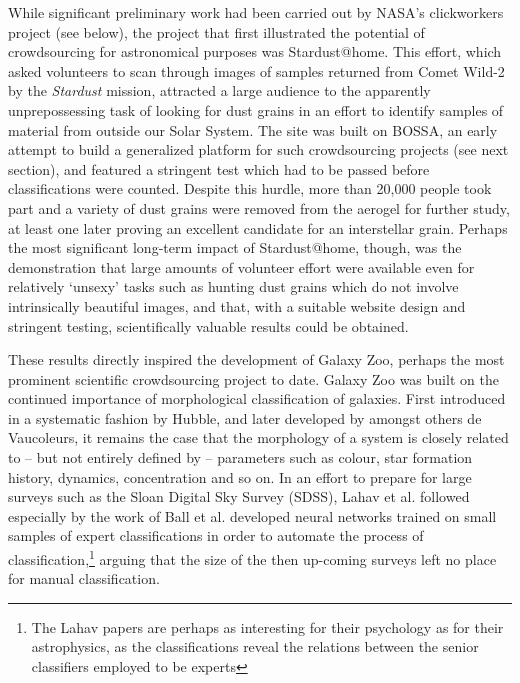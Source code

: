 \documentclass{ar2e}
\begin{document}
While significant preliminary work had been carried out by NASA's clickworkers
project (see below), the project that first illustrated the potential of
crowdsourcing for astronomical purposes was Stardust@home. This effort, which
asked volunteers to scan through images of samples returned from Comet Wild-2
by the \emph{Stardust} mission, attracted a large audience to the apparently
unprepossessing task of looking for dust grains in an effort to identify
samples of material from outside our Solar System. The site was built on
BOSSA, an early attempt to build a generalized platform for such crowdsourcing
projects (see next section), and featured a stringent test which had to be
passed before classifications were counted. Despite this hurdle, more than
20,000 people took part and a variety of dust grains were removed from the
aerogel for further study, at least one later proving an excellent candidate
for an interstellar grain. Perhaps the most significant long-term impact of
Stardust@home, though, was the demonstration that large amounts of volunteer
effort were available even for relatively `unsexy' tasks such as hunting dust
grains which do not involve intrinsically beautiful images, and that, with a
suitable website design and stringent testing, scientifically valuable results
could be obtained. 




These results directly inspired the development of Galaxy Zoo, perhaps the most
prominent scientific crowdsourcing project to date. Galaxy Zoo was built on the
continued importance of morphological classification of galaxies. First
introduced in a systematic fashion by Hubble, and later developed by amongst
others de Vaucoleurs, it remains the case that the morphology of a system is
closely related to -- but not entirely defined by -- parameters such as colour,
star formation history, dynamics, concentration and so on.  In an effort to
prepare for large surveys such as the Sloan Digital Sky Survey (SDSS), Lahav et
al. followed especially by the work of Ball et al. developed neural networks
trained on small samples of expert classifications in order to automate the
process of classification,\footnote{The Lahav papers are perhaps as interesting
for their psychology as for their astrophysics, as the classifications reveal
the relations between the senior classifiers employed to be experts} arguing
that the size of the then up-coming surveys left no place for manual
classification.
\end{document}
